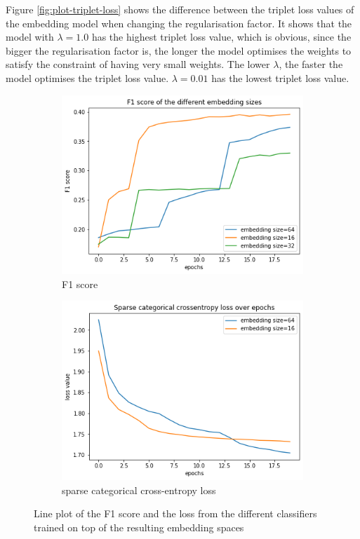 \newline
\newline
Figure \ref{fig:plot-triplet-loss} shows the difference between the triplet loss values of the embedding model when changing the regularisation factor. It shows that the model with $\lambda = 1.0$ has the highest triplet loss value, which is obvious, since the bigger the regularisation factor is, the longer the model optimises the weights to satisfy the constraint of having very small weights. The lower $\lambda$, the faster the model optimises the triplet loss value. $\lambda = 0.01$ has the lowest triplet loss value.
\begin{figure}[tb]
\captionsetup{format=plain}
\centering
\begin{subfigure}{.5\linewidth}
  \centering
  \includegraphics[width=.9\linewidth]{study-doc/experiment_embedding_size/assets/classifier_f1.png}
  \caption{F1 score}
  \label{fig:regularisation-experiment-classifier-f1}
\end{subfigure}%
\begin{subfigure}{.5\linewidth}
  \centering
  \includegraphics[width=.9\linewidth]{study-doc/experiment_embedding_size/assets/classifier_loss.png}
  \caption{sparse categorical cross-entropy loss}
  \label{fig:regularisation-experiment-classifier-loss}
\end{subfigure}
\caption{Line plot of the F1 score and the loss from the different classifiers trained on top of the resulting embedding spaces}
\label{fig:regularisation-experiment-classifier-metrics}
\end{figure}
